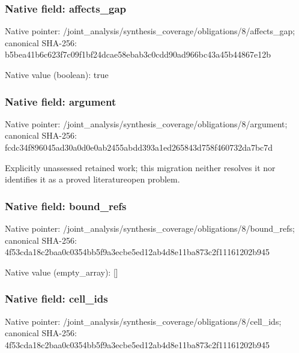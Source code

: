 \documentclass[10pt,a4paper]{article}
\begin{document}
\subsubsection{Native field: affects\_gap}


Native pointer: /joint\_analysis/synthesi\allowbreak{}s\_coverage/obligations/8\allowbreak{}/affects\_gap; canonical SHA-256: b5bea41b6c623f7c09f1bf24\allowbreak{}dcae58ebab3c0cdd90ad966b\allowbreak{}c43a45b44867e12b



Native value (boolean): true



\subsubsection{Native field: argument}


Native pointer: /joint\_analysis/synthesi\allowbreak{}s\_coverage/obligations/8\allowbreak{}/argument; canonical SHA-256: fcdc34f896045ad30a0d0e0a\allowbreak{}b2455abdd393a1ed265843d7\allowbreak{}58f460732da7bc7d


Explicitly unassessed retained work; this migration neither resolves it nor identifies it as a proved literatureopen problem.


\subsubsection{Native field: bound\_refs}


Native pointer: /joint\_analysis/synthesi\allowbreak{}s\_coverage/obligations/8\allowbreak{}/bound\_refs; canonical SHA-256: 4f53cda18c2baa0c0354bb5f\allowbreak{}9a3ecbe5ed12ab4d8e11ba87\allowbreak{}3c2f11161202b945



Native value (empty\_array): []



\subsubsection{Native field: cell\_ids}


Native pointer: /joint\_analysis/synthesi\allowbreak{}s\_coverage/obligations/8\allowbreak{}/cell\_ids; canonical SHA-256: 4f53cda18c2baa0c0354bb5f\allowbreak{}9a3ecbe5ed12ab4d8e11ba87\allowbreak{}3c2f11161202b945
\end{document}

